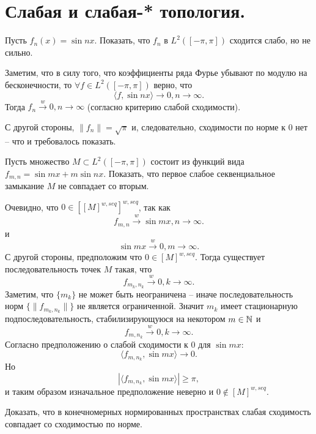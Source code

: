 \section{Слабая и слабая-* топология.}
\begin{task}[10.3]
    Пусть $f_n(x) = \sin nx$.
    Показать, что $f_n$ в $L^2([-\pi, \pi])$ сходится слабо, но не сильно.
\end{task}
\begin{solution}
    Заметим, что в силу того, что коэффициенты ряда Фурье убывают по модулю на бесконечности, то $\forall f \in L^2([-\pi, \pi])$ верно, что
    \[
        \langle f, \sin nx \rangle \rightarrow 0, n \rightarrow \infty.
    \]
    Тогда $f_n \xrightarrow{w} 0, n \rightarrow \infty$ (согласно критерию слабой сходимости).

    С другой стороны, $\|f_n\| = \sqrt{\pi}$ и, следовательно, сходимости по норме к $0$ нет -- что и требовалось показать.
\end{solution}
\begin{task}[10.4]
    Пусть множество $M \subset L^2([-\pi, \pi])$ состоит из функций вида $f_{m, n} = \sin mx + m \sin nx$.
    Показать, что первое слабое секвенциальное замыкание $M$ не совпадает со вторым.
\end{task}
\begin{solution}
    Очевидно, что $0 \in \left[\left[ M \right]^{w, seq}\right]^{w, seq}$, так как
    \[
        f_{m, n} \xrightarrow{w} \sin mx, n \rightarrow \infty.
    \]
    и
    \[
        \sin mx \xrightarrow{w} 0, m \rightarrow \infty.
    \]
    С другой стороны, предположим что $0 \in \left[ M \right]^{w, seq}$.
    Тогда существует последовательность точек $M$ такая, что
    \[
        f_{m_k, n_k} \xrightarrow{w} 0, k \rightarrow \infty.
    \]
    Заметим, что $\{m_k\}$ не может быть неограничена -- иначе последовательность норм $\{\|f_{m_k, n_k}\|\}$ не является ограниченной.
    Значит $m_k$ имеет стационарную подпоследовательность, стабилизирующуюся на некотором $m \in \mathbb{N}$ и
    \[
        f_{m, n_k} \xrightarrow{w} 0, k \rightarrow \infty.
    \]
    Согласно предположению о слабой сходимости к $0$ для $\sin mx\colon$
    \[
        \langle f_{m, n_k}, \sin mx \rangle \rightarrow 0.
    \]
    Но
    \[
        |\langle f_{m, n_k}, \sin mx \rangle| \geq \pi,
    \]
    и таким образом изначальное предположение неверно и $0 \notin [M]^{w, seq}$.
\end{solution}
\begin{task}[10.6]
    Доказать, что в конечномерных нормированных пространствах слабая сходимость совпадает со сходимостью по норме.
\end{task}
